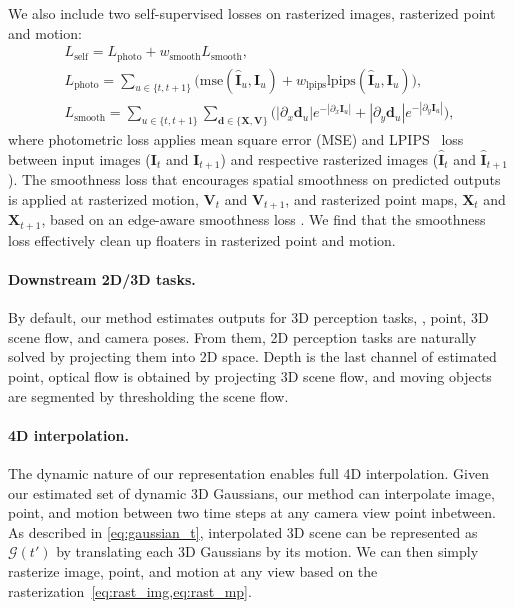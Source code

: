 We also include two self-supervised losses on rasterized images, rasterized point and motion:
\begin{subequations}
\begin{gather}
    L_\text{self} = L_\text{photo} + w_{\text{smooth}} L_\text{smooth}, \\
    L_\text{photo} = \textstyle\sum_{u \in \{t, t+1\}} \big( {\text{mse}(\hat{\mathbf{I}}_u, \mathbf{I}_u) + w_{\text{lpips}} \text{lpips}(\hat{\mathbf{I}}_u, \mathbf{I}_u)} \big), \\
    L_\text{smooth} = \textstyle\sum_{u \in \{t, t+1\}} \textstyle\sum_{\mathbf{d} \in \{ \mathbf{X}, \mathbf{V}\}} \big( |\partial_x \mathbf{d}_u|e^{-|\partial_x \mathbf{I}_u|} + |\partial_y \mathbf{d}_u|e^{-|\partial_y \mathbf{I}_u |} \big),
\label{eq:loss:self}
\end{gather}
\end{subequations}
where photometric loss applies mean square error (MSE) and LPIPS~\citep{LPIPS} loss between input images ($\mathbf{I}_t$ and $\mathbf{I}_{t+1}$) and respective rasterized images ($\hat{\mathbf{I}}_{t}$ and $\hat{\mathbf{I}}_{t+1}$).
The smoothness loss that encourages spatial smoothness on predicted outputs is applied at rasterized motion, $\mathbf{V}_{t}$ and $\mathbf{V}_{t+1}$, and rasterized point maps, $\mathbf{X}_{t}$ and $\mathbf{X}_{t+1}$, based on an edge-aware smoothness loss \citep{Godard:2017:UMD,Godard:2019:DIS}.
We find that the smoothness loss effectively clean up floaters in rasterized point and motion.

\paragraph{Downstream 2D/3D tasks.}
By default, our method estimates outputs for 3D perception tasks, \ie, point, 3D scene flow, and camera poses. 
From them, 2D perception tasks are naturally solved by projecting them into 2D space. 
Depth is the last channel of estimated point, optical flow is obtained by projecting 3D scene flow, and moving objects are segmented by thresholding the scene flow.

\paragraph{4D interpolation.} 
The dynamic nature of our representation enables full 4D interpolation.
Given our estimated set of dynamic 3D Gaussians, our method can interpolate image, point, and motion between two time steps at any camera view point inbetween.
As described in \cref{eq:gaussian_t}, interpolated 3D scene can be represented as $\mathcal{G}(t')$ by translating each 3D Gaussians by its motion.
We can then simply rasterize image, point, and motion at any view based on the rasterization~\cref{eq:rast_img,eq:rast_mp}.
